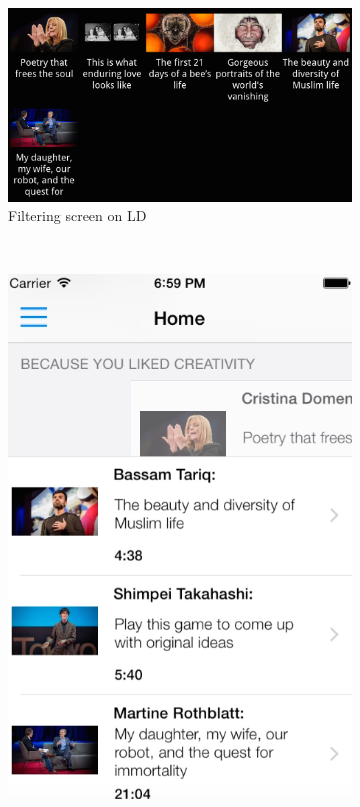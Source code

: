 \begin{figure}
    \centering
    \begin{subfigure}[b]{0.6\textwidth}
        \includegraphics[width=\textwidth]{figures/filterLD}
        \caption{Filtering screen on LD}
        \label{fig:figure47a}
    \end{subfigure}
    ~ %
    \begin{subfigure}[b]{0.3\textwidth}
        \includegraphics[width=\textwidth]{figures/swiperightSD}

\end{subfigure}
\end{figure}
